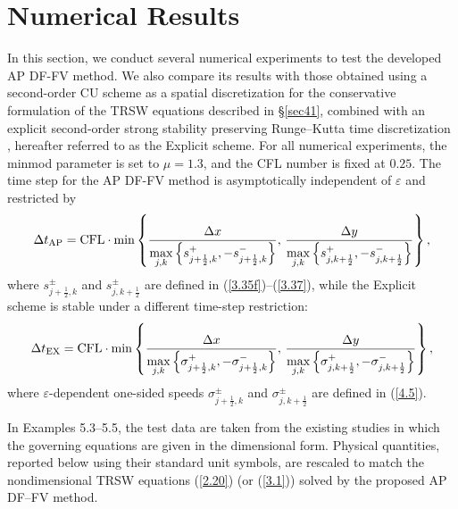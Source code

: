 \documentclass[a4paper,11pt,twoside]{article}
\numberwithin{equation}{section}
\numberwithin{figure}{section}
\numberwithin{table}{section}
\newcommand{\jR}{j+\frac{1}{2}}
\newcommand{\kR}{k+\frac{1}{2}}
\newcommand{\eps}{\varepsilon}
\newcommand{\dt}{\Delta t}
\newcommand{\dx}{\Delta x}
\newcommand{\dy}{\Delta y}
\newcommand\eref[1]{(\ref{#1})}
\begin{document}
\section{Numerical Results}\label{sec5}
In this section, we conduct several numerical experiments to test the developed AP DF-FV method. We also compare its results with those
obtained using a second-order CU scheme as a spatial discretization for the conservative formulation of the TRSW equations described in
\S\ref{sec41}, combined with an explicit second-order strong stability preserving Runge–Kutta time discretization \cite{Gottlieb_2001},
hereafter referred to as the Explicit scheme. For all numerical experiments, the minmod parameter is set to $\mu=1.3$, and the CFL number is
fixed at $0.25$. The time step for the AP DF-FV method is asymptotically independent of $\eps$ and restricted by 
\begin{equation*}
\dt_{\rm AP}={\rm CFL}\cdot\min\left\{\frac{\dx}{\max\limits_{j,k}\Big\{s_{\jR,k}^+,-s_{\jR,k}^-\Big\}},\,
\frac{\dy}{\max\limits_{j,k}\Big\{s_{j,\kR}^+,-s_{j,\kR}^-\Big\}}\right\},
\end{equation*}
where $s_{\jR,k}^{\pm}$ and $s_{j,\kR}^{\pm}$ are defined in \eref{3.35f}--\eref{3.37}, while the Explicit scheme is stable under a
different time-step restriction:
\begin{equation*}
\dt_{\rm EX}={\rm CFL}\cdot\min\left\{\frac{\dx}{\max\limits_{j,k}\Big\{\sigma_{\jR,k}^+,-\sigma_{\jR,k}^-\Big\}},\,
\frac{\dy}{\max\limits_{j,k}\Big\{\sigma_{j,\kR}^+,-\sigma_{j,\kR}^-\Big\}}\right\},
\end{equation*}
where $\eps$-dependent one-sided speeds $\sigma_{\jR,k}^\pm$ and $\sigma_{j,\kR}^\pm$ are defined in \eref{4.5}.

In Examples 5.3--5.5, the test data are taken from the existing studies in which the governing equations are given in the dimensional form.
Physical quantities, reported below using their standard unit symbols, are rescaled to match the nondimensional TRSW equations \eref{2.20}
(or \eref{3.1}) solved by the proposed AP DF–FV method.
\end{document}
